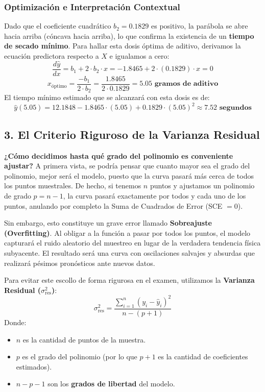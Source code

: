 \documentclass[11pt,a4paper]{article}
\begin{document}
    \subsubsection*{Optimización e Interpretación Contextual}
    Dado que el coeficiente cuadrático $b_2 = 0.1829$ es positivo, la parábola se abre hacia arriba (cóncava hacia arriba), lo que confirma la existencia de un \textbf{tiempo de secado mínimo}. Para hallar esta dosis óptima de aditivo, derivamos la ecuación predictora respecto a $X$ e igualamos a cero:
    \[ \frac{d\hat{y}}{dx} = b_1 + 2 \cdot b_2 \cdot x = -1.8465 + 2 \cdot (0.1829) \cdot x = 0 \]
    \[ x_{\text{óptimo}} = \frac{-b_1}{2 \cdot b_2} = \frac{1.8465}{2 \cdot 0.1829} = \mathbf{5.05 \text{ gramos de aditivo}} \]
    El tiempo mínimo estimado que se alcanzará con esta dosis es de:
    \[ \hat{y}(5.05) = 12.1848 - 1.8465 \cdot (5.05) + 0.1829 \cdot (5.05)^2 \approx \mathbf{7.52 \text{ segundos}} \]
 

\newpage
\subsection{3. El Criterio Riguroso de la Varianza Residual}
    \textbf{¿Cómo decidimos hasta qué grado del polinomio es conveniente ajustar?}
    A primera vista, se podría pensar que cuanto mayor sea el grado del polinomio, mejor será el modelo, puesto que la curva pasará más cerca de todos los puntos muestrales. De hecho, si tenemos $n$ puntos y ajustamos un polinomio de grado $p = n - 1$, la curva pasará exactamente por todos y cada uno de los puntos, anulando por completo la Suma de Cuadrados de Error (SCE $= 0$).
    
    Sin embargo, esto constituye un grave error llamado \textbf{Sobreajuste (Overfitting)}. Al obligar a la función a pasar por todos los puntos, el modelo capturará el ruido aleatorio del muestreo en lugar de la verdadera tendencia física subyacente. El resultado será una curva con oscilaciones salvajes y absurdas que realizará pésimos pronósticos ante nuevos datos.

    Para evitar este escollo de forma rigurosa en el examen, utilizamos la \textbf{Varianza Residual ($\sigma^2_{\text{res}}$)}:
    \begin{equation}
        \sigma^2_{\text{res}} = \frac{\sum_{i=1}^n (y_i - \hat{y}_i)^2}{n - (p + 1)}
    \end{equation}
    Donde:
    \begin{itemize}
        \item $n$ es la cantidad de puntos de la muestra.
        \item $p$ es el grado del polinomio (por lo que $p+1$ es la cantidad de coeficientes estimados).
        \item $n - p - 1$ son los \textbf{grados de libertad} del modelo.
    \end{itemize}
\end{document}
